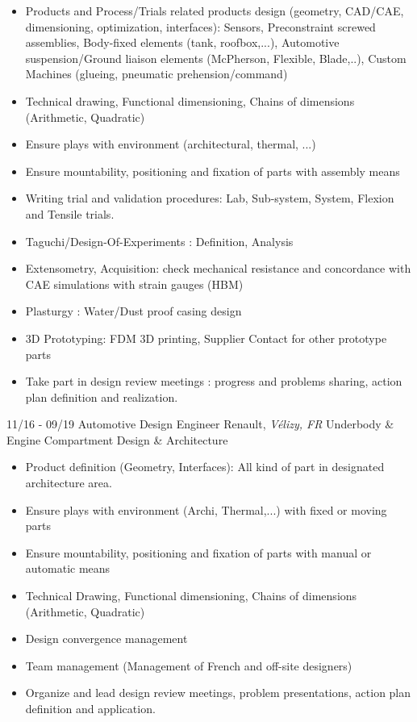 \documentclass[]{friggeri-cv}
\begin{document}
\vspace{0.5mm}
\begin{itemize}
\setlength{\itemsep}{1pt}
\setlength{\parskip}{0pt}
\setlength{\parsep}{0pt}

\item Products and Process/Trials related products design (geometry, CAD/CAE, dimensioning, optimization, interfaces): Sensors, Preconstraint screwed assemblies, Body-fixed elements (tank, roofbox,...), Automotive suspension/Ground liaison elements (McPherson, Flexible, Blade,..), Custom Machines (glueing, pneumatic prehension/command)
\item Technical drawing, Functional dimensioning, Chains of dimensions (Arithmetic, Quadratic)
\item Ensure plays with environment (architectural, thermal, ...)
\item Ensure mountability, positioning and fixation of parts with assembly means
\item Writing trial and validation procedures: Lab, Sub-system, System, Flexion and Tensile trials.
\item Taguchi/Design-Of-Experiments : Definition, Analysis
\item Extensometry, Acquisition: check mechanical resistance and concordance with CAE simulations with strain gauges (HBM)
\item Plasturgy : Water/Dust proof casing design
\item 3D Prototyping: FDM 3D printing, Supplier Contact for other prototype parts
\item Take part in design review meetings : progress and problems sharing, action plan definition and realization.
\end{itemize}

\begin{entrylist}
  \entry
    {11/16 - 09/19}
    {Automotive Design Engineer}
    {Renault, \textit{Vélizy, FR}}
    {Underbody \& Engine Compartment Design \& Architecture}
\end{entrylist}
\vspace{-15pt}

\vspace{0.5mm}
\begin{itemize}
\setlength{\itemsep}{1pt}
\setlength{\parskip}{0pt}
\setlength{\parsep}{0pt}

\item Product definition (Geometry, Interfaces): All kind of part in designated architecture area.
\item Ensure plays with environment (Archi, Thermal,...) with fixed or moving parts
\item Ensure mountability, positioning and fixation of parts with manual or automatic means
\item Technical Drawing, Functional dimensioning, Chains of dimensions (Arithmetic, Quadratic)
\item Design convergence management
\item Team management (Management of French and off-site designers)
\item Organize and lead design review meetings, problem presentations, action plan definition and application.
\end{itemize}
\end{document}
